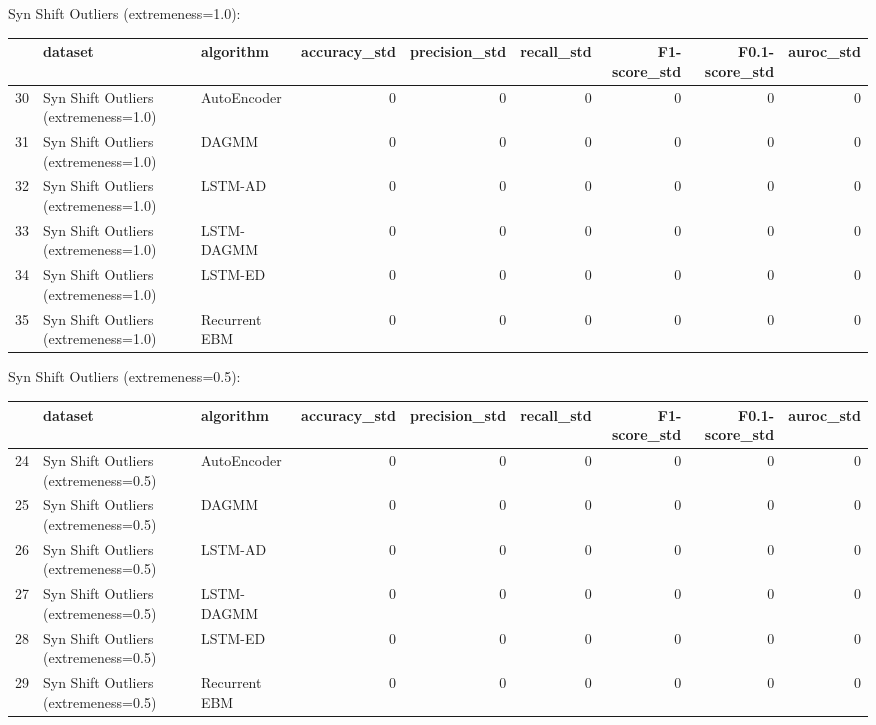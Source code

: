 Syn Shift Outliers (extremeness=1.0):

\begin{tabular}{rllrrrrrr}
\hline
    & dataset                              & algorithm     &   accuracy\_std &   precision\_std &   recall\_std &   F1-score\_std &   F0.1-score\_std &   auroc\_std \\
\hline
 30 & Syn Shift Outliers (extremeness=1.0) & AutoEncoder   &              0 &               0 &            0 &              0 &                0 &           0 \\
 31 & Syn Shift Outliers (extremeness=1.0) & DAGMM         &              0 &               0 &            0 &              0 &                0 &           0 \\
 32 & Syn Shift Outliers (extremeness=1.0) & LSTM-AD       &              0 &               0 &            0 &              0 &                0 &           0 \\
 33 & Syn Shift Outliers (extremeness=1.0) & LSTM-DAGMM    &              0 &               0 &            0 &              0 &                0 &           0 \\
 34 & Syn Shift Outliers (extremeness=1.0) & LSTM-ED       &              0 &               0 &            0 &              0 &                0 &           0 \\
 35 & Syn Shift Outliers (extremeness=1.0) & Recurrent EBM &              0 &               0 &            0 &              0 &                0 &           0 \\
\hline
\end{tabular}

Syn Shift Outliers (extremeness=0.5):

\begin{tabular}{rllrrrrrr}
\hline
    & dataset                              & algorithm     &   accuracy\_std &   precision\_std &   recall\_std &   F1-score\_std &   F0.1-score\_std &   auroc\_std \\
\hline
 24 & Syn Shift Outliers (extremeness=0.5) & AutoEncoder   &              0 &               0 &            0 &              0 &                0 &           0 \\
 25 & Syn Shift Outliers (extremeness=0.5) & DAGMM         &              0 &               0 &            0 &              0 &                0 &           0 \\
 26 & Syn Shift Outliers (extremeness=0.5) & LSTM-AD       &              0 &               0 &            0 &              0 &                0 &           0 \\
 27 & Syn Shift Outliers (extremeness=0.5) & LSTM-DAGMM    &              0 &               0 &            0 &              0 &                0 &           0 \\
 28 & Syn Shift Outliers (extremeness=0.5) & LSTM-ED       &              0 &               0 &            0 &              0 &                0 &           0 \\
 29 & Syn Shift Outliers (extremeness=0.5) & Recurrent EBM &              0 &               0 &            0 &              0 &                0 &           0 \\
\hline
\end{tabular}

